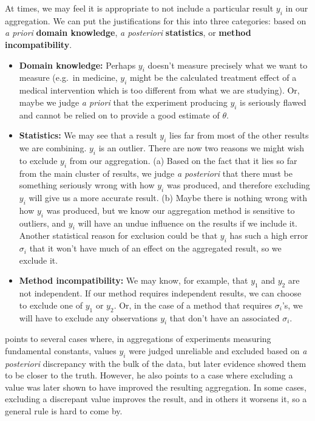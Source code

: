 \documentclass[12pt]{article}
\begin{document}
At times, we may feel it is appropriate to not include a particular result $y_i$ in our aggregation. We can put the justifications for this into three categories: based on \textit{a priori} \textbf{domain knowledge}, \textit{a posteriori} \textbf{statistics}, or \textbf{method incompatibility}.

\begin{itemize}
  \item \textbf{Domain knowledge:} Perhaps $y_i$ doesn't measure precisely what we want to measure (e.g.~in medicine, $y_i$ might be the calculated treatment effect of a medical intervention which is too different from what we are studying). Or, maybe we judge \textit{a priori} that the experiment producing $y_i$ is seriously flawed and cannot be relied on to provide a good estimate of $\theta$.
  \item \textbf{Statistics:} We may see that a result $y_i$ lies far from most of the other results we are combining. $y_i$ is an outlier. There are now two reasons we might wish to exclude $y_i$ from our aggregation. (a) Based on the fact that it lies so far from the main cluster of results, we judge \textit{a posteriori} that there must be something seriously wrong with how $y_i$ was produced, and therefore excluding $y_i$ will give us a more accurate result. (b) Maybe there is nothing wrong with how $y_i$ was produced, but we know our aggregation method is sensitive to outliers, and $y_i$ will have an undue influence on the results if we include it. Another statistical reason for exclusion could be that $y_i$ has such a high error $\sigma_i$ that it won't have much of an effect on the aggregated result, so we exclude it.
  \item \textbf{Method incompatibility:} We may know, for example, that $y_1$ and $y_2$ are not independent. If our method requires independent results, we can choose to exclude one of $y_1$ or $y_2$. Or, in the case of a method that requires $\sigma_i$'s, we will have to exclude any observations $y_i$ that don't have an associated $\sigma_i$.
\end{itemize}

\citet{taylor1982numerical} points to several cases where, in aggregations of experiments measuring fundamental constants, values $y_i$ were judged unreliable and excluded based on \textit{a posteriori} discrepancy with the bulk of the data, but later evidence showed them to be closer to the truth. However, he also points to a case where excluding a value was later shown to have improved the resulting aggregation. In some cases, excluding a discrepant value improves the result, and in others it worsens it, so a general rule is hard to come by.
\end{document}
